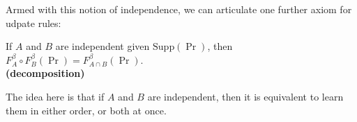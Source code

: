 \documentclass{article}
\begin{document}
\begin{wip}
Armed with this notion of independence, we can articulate one further axiom for udpate rules:
\begin{CFaxioms}
    \item
    If $A$ and $B$ are independent given $\mathrm{Supp}(\Pr)$, then
    $F^{\beta}_A \circ F^{\beta}_B (\Pr) = F^{\beta}_{A \cap B}(\Pr)$. \\
        \hfill \textbf{(decomposition)}
\end{CFaxioms}
The idea here is that if $A$ and $B$ are independent, then it is equivalent to learn them in either order, or both at once.
\end{wip}
\end{document}
